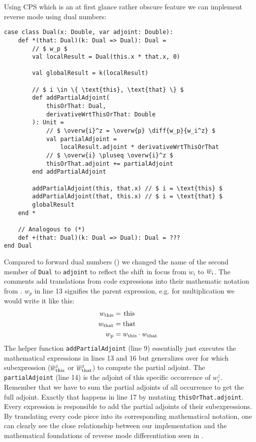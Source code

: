 Using CPS which is an at first glance rather obscure feature we can implement reverse mode using dual numbers:
\begin{lstlisting}[mathescape=true, caption={Reverse mode CPS}, label={lst:cpsDual}]
case class Dual(x: Double, var adjoint: Double):
    def *(that: Dual)(k: Dual => Dual): Dual =
        // $ w_p $
        val localResult = Dual(this.x * that.x, 0)

        val globalResult = k(localResult)
        
        // $ i \in \{ \text{this}, \text{that} \} $
        def addPartialAdjoint(
            thisOrThat: Dual, 
            derivativeWrtThisOrThat: Double
        ): Unit =
            // $ \overw{i}^z = \overw{p} \diff{w_p}{w_i^z} $ 
            val partialAdjoint = 
                localResult.adjoint * derivativeWrtThisOrThat
            // $ \overw{i} \pluseq \overw{i}^z $
            thisOrThat.adjoint += partialAdjoint
        end addPartialAdjoint

        addPartialAdjoint(this, that.x) // $ i = \text{this} $
        addPartialAdjoint(that, this.x) // $ i = \text{that} $
        globalResult
    end *

    // Analogous to (*)
    def +(that: Dual)(k: Dual => Dual): Dual = ???
end Dual
\end{lstlisting}
Compared to forward dual numbers () we changed the name of the second member of \lstinline{Dual} to \lstinline{adjoint} to reflect the shift in focus from $\dot w_i$ to $\overline{w}_{i}$. The comments add translations from code expressions into their mathematic notation from . $w_p$ in line 13 signifies the parent expression, e.g. for multiplication we would write it like this:
\begin{align*}
    w_{\text{this}} &= \text{\lstinline{this}} \\
    w_{\text{that}} &= \text{\lstinline{that}} \\
    w_p &= w_{\text{this}} \cdot w_{\text{that}}
\end{align*}
The helper function \lstinline{addPartialAdjoint} (line 9) essentially just executes the mathematical expressions in lines 13 and 16 but generalizes over for which subexpression ($\overline{w}_{\text{this}}^z$ or $\overline{w}_{\text{that}}^z$) to compute the partial adjoint. The \lstinline{partialAdjoint} (line 14) is the adjoint of this specific occurrence of $ w_i^z $. Remember that we have to sum the partial adjoints of all occurrence to get the full adjoint. Exactly that happens in line 17 by mutating \lstinline{thisOrThat.adjoint}. Every expression is responsible to add the partial adjoints of their subexpressions. By translating every code piece into its corresponding mathematical notation, one can clearly see the close relationship between our implementation and the mathematical foundations of reverse mode differentiation seen in .

